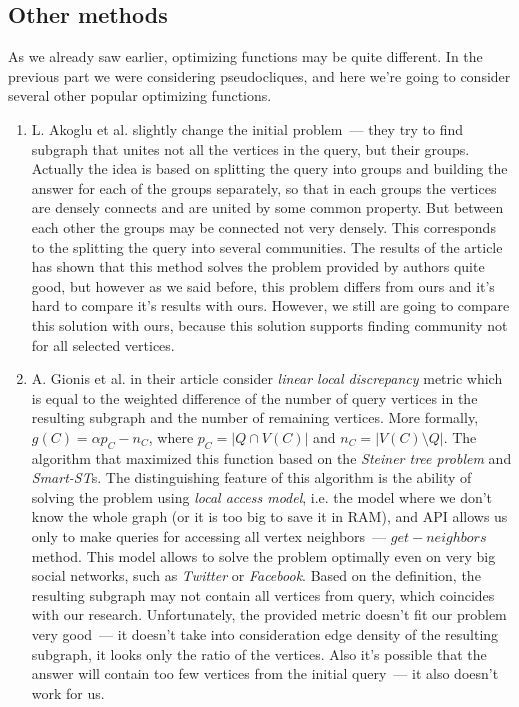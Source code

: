 \subsection{Other methods}

As we already saw earlier, optimizing functions may be quite different. In the previous part we were considering pseudocliques, and here we're going to consider several other popular optimizing functions.

\begin{enumerate}
  \item L. Akoglu et al. \cite{Akoglu13} slightly change the initial problem~--- they try to find subgraph that unites not all the vertices in the query, but their groups. Actually the idea is based on splitting the query into groups and building the answer for each of the groups separately, so that in each groups the vertices are densely connects and are united by some common property. But between each other the groups may be connected not very densely. This corresponds to the splitting the query into several communities. The results of the article has shown that this method solves the problem provided by authors quite good, but however as we said before, this problem differs from ours and it's hard to compare it's results with ours. However, we still are going to compare this solution with ours, because this solution supports finding community not for all selected vertices. 

  \item A. Gionis et al. \cite{Gionis15} in their article consider \textit{linear local discrepancy} metric which is equal to the weighted difference of the number of query vertices in the resulting subgraph and the number of remaining vertices. More formally, $g(C) = \alpha p_C - n_C$, where $p_C = |Q \cap V(C)|$ and $n_C = |V(C) \setminus Q|$. The algorithm that maximized this function based on the \textit{Steiner tree problem} and \textit{Smart-ST}s. The distinguishing feature of this algorithm is the ability of solving the problem using \textit{local access model}, i.e. the model where we don't know the whole graph (or it is too big to save it in RAM), and API allows us only to make queries for accessing all vertex neighbors~--- $get-neighbors$ method. This model allows to solve the problem optimally even on very big social networks, such as \textit{Twitter} or \textit{Facebook}. Based on the definition, the resulting subgraph may not contain all vertices from query, which coincides with our research. Unfortunately, the provided metric doesn't fit our problem very good~--- it doesn't take into consideration edge density of the resulting subgraph, it looks only the ratio of the vertices. Also it's possible that the answer will contain too few vertices from the initial query~--- it also doesn't work for us.
\end{enumerate}

